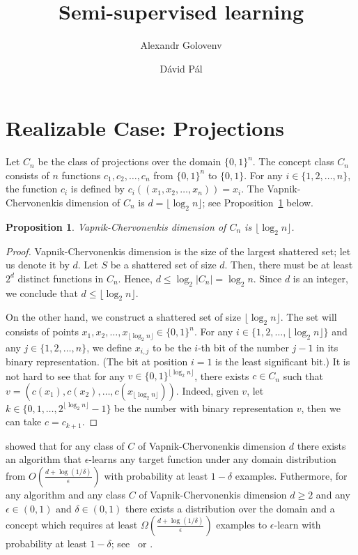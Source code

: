 \documentclass[12pt]{article}
\title{Semi-supervised learning}
\author{Alexandr Golovenv \and D\'avid P\'al}
\newtheorem{proposition}{Proposition}
\begin{document}
\maketitle

\section{Realizable Case: Projections}

Let $C_n$ be the class of projections over the domain $\{0,1\}^n$. The concept
class $C_n$ consists of $n$ functions $c_1, c_2, \dots, c_n$ from $\{0,1\}^n$
to $\{0,1\}$. For any $i \in \{1,2,\dots,n\}$, the function $c_i$ is defined by $c_i((x_1, x_2,
\dots, x_n)) = x_i$. The Vapnik-Chervonenkis dimension of $C_n$ is $d = \lfloor
\log_2 n \rfloor$; see Proposition~\ref{proposition:vc-dimension-projections}
below.

\begin{proposition}
\label{proposition:vc-dimension-projections}
Vapnik-Chervonenkis dimension of $C_n$ is $\lfloor \log_2 n \rfloor$.
\end{proposition}

\begin{proof}
Vapnik-Chervonenkis dimension is the size of the largest shattered set; let us
denote it by $d$. Let $S$ be a shattered set of size $d$. Then, there must be at
least $2^d$ distinct functions in $C_n$. Hence, $d \le \log_2 |C_n| =
\log_2 n$. Since $d$ is an integer, we conclude that $d \le \lfloor \log_2 n
\rfloor$.

On the other hand, we construct a shattered set of size $\lfloor \log_2 n
\rfloor$. The set will consists of points $x_1, x_2, \dots, x_{\lfloor
\log_2 n \rfloor} \in \{0,1\}^n$. For any $i \in \{1,2,\dots,\lfloor \log_2 n \rfloor\}$
and any $j \in \{1,2,\dots,n\}$, we define $x_{i,j}$ to be the $i$-th bit of
the number $j-1$ in its binary representation. (The bit at position $i=1$ is the least significant bit.)
It is not hard to see that for any $v \in \{0,1\}^{\lfloor \log_2 n
\rfloor}$, there exists $c \in C_n$ such that $v = (c(x_1), c(x_2), \dots,
c(x_{\lfloor \log_2 n \rfloor}))$. Indeed, given $v$, let $k \in \{0,1,\dots,2^{\lfloor \log_2 n
\rfloor} - 1\}$ be the number with binary representation $v$,
then we can take $c = c_{k+1}$.
\end{proof}

\cite{Hanneke-2016} showed that for any class of $C$ of Vapnik-Chervonenkis
dimension $d$ there exists an algorithm that $\epsilon$-learns any target function
under any domain distribution  from $O\left(\frac{d + \log(1/\delta)}{\epsilon}\right)$
with probability at least $1-\delta$ examples. Futhermore, for any algorithm
and any class $C$ of Vapnik-Chervonenkis dimension $d \ge 2$ and any $\epsilon
\in (0,1)$ and $\delta \in (0,1)$ there exists a distribution over the domain
and a concept which requires at least $\Omega \left(\frac{d +
\log(1/\delta)}{\epsilon}\right)$ examples to $\epsilon$-learn with probability
at least $1 - \delta$; see~\cite[Theorem 5.3]{Anthony-Bartlett-1999} or
\cite{Blumer-Ehrenfeucht-Haussler-Warmuth-1989,
Ehrenfeucht-Haussler-Kearns-Valiant-1989}.
\end{document}

